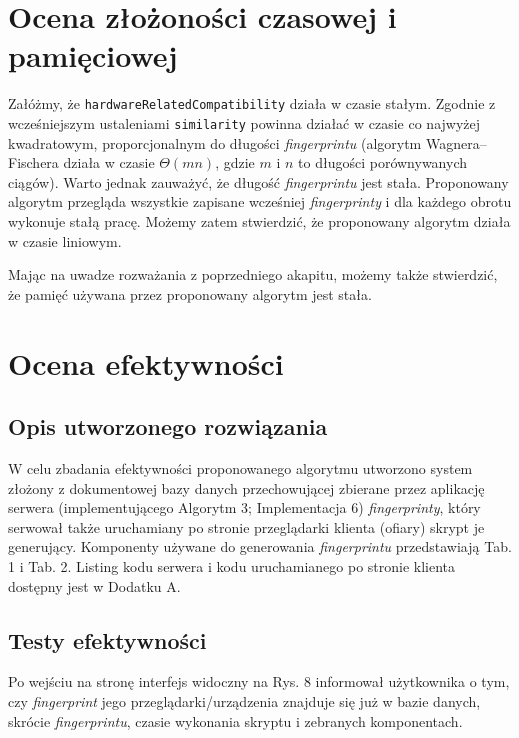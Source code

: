 

\section{Ocena złożoności czasowej i pamięciowej}
Załóżmy, że \texttt{hardwareRelatedCompatibility} działa w czasie stałym.
Zgodnie z wcześniejszym ustaleniami \texttt{similarity} powinna działać w czasie
co najwyżej kwadratowym, proporcjonalnym do długości \emph{fingerprintu}
(algorytm Wagnera--Fischera działa w czasie \(\Theta(mn)\), gdzie \(m\) i \(n\)
to długości porównywanych ciągów). Warto jednak zauważyć, że długość
\emph{fingerprintu} jest stała. Proponowany algorytm przegląda wszystkie
zapisane wcześniej \emph{fingerprinty} i dla każdego obrotu wykonuje stałą
pracę. Możemy zatem stwierdzić, że proponowany algorytm działa w czasie
liniowym.

Mając na uwadze rozważania z poprzedniego akapitu, możemy także stwierdzić, że
pamięć używana przez proponowany algorytm jest stała.

\section{Ocena efektywności}

\subsection{Opis utworzonego rozwiązania}
W celu zbadania efektywności proponowanego algorytmu utworzono system złożony z
dokumentowej bazy danych przechowującej zbierane przez aplikację serwera
(implementującego Algorytm 3; Implementacja 6) \emph{fingerprinty}, który
serwował także uruchamiany po stronie przeglądarki klienta (ofiary) skrypt je
generujący. Komponenty używane do generowania \emph{fingerprintu} przedstawiają
Tab. 1 i Tab. 2. Listing kodu serwera i kodu uruchamianego po stronie klienta
dostępny jest w Dodatku A.

\subsection{Testy efektywności}
Po wejściu na stronę interfejs widoczny na Rys. 8 informował użytkownika o tym,
czy \emph{fingerprint} jego przeglądarki/urządzenia znajduje się już w bazie
danych, skrócie \emph{fingerprintu}, czasie wykonania skryptu i zebranych
komponentach.

